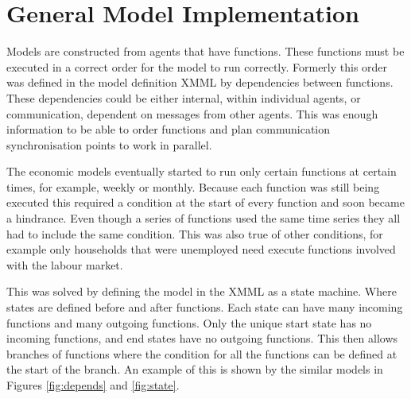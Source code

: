 \section{General Model Implementation}


Models are constructed from agents that have functions. These functions must be
executed in a correct order for the model to run correctly. Formerly this order
was defined in the model definition XMML by dependencies between functions. These
dependencies could be either internal, within individual agents, or
communication, dependent on messages from other agents. This was enough
information to be able to order functions and plan communication synchronisation
points to work in parallel.

The economic models eventually started to run only certain functions at
certain times, for example, weekly or monthly. Because each function
was still being executed this required a condition at the start of every
function and soon became a hindrance. Even though a series of functions used
the same time series they all had to include the same condition. This was also
true of other conditions, for example only households that were unemployed need
execute functions involved with the labour market.

This was solved by defining the model in the XMML as a state machine. Where
states are defined before and after functions.
Each state can have many incoming functions and many outgoing functions.
Only the unique start state has no incoming functions, and end states have no
outgoing functions. This then allows branches of functions where the condition
for all the functions can be defined at the start of the branch.
An example of this is shown by the similar models in Figures \ref{fig:depends}
and \ref{fig:state}.

